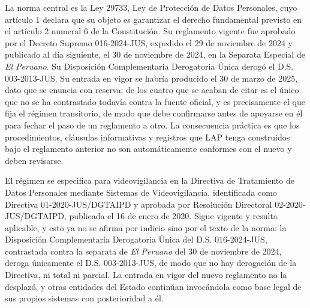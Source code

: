 La norma central es la Ley 29733, Ley de Protección de Datos Personales,
cuyo artículo 1 declara que su objeto es garantizar el derecho
fundamental previsto en el artículo 2 numeral 6 de la Constitución. Su
reglamento vigente fue aprobado por el Decreto Supremo 016-2024-JUS,
expedido el 29 de noviembre de 2024 y publicado al día siguiente, el 30
de noviembre de 2024, en la Separata Especial de \emph{El Peruano}. Su
Disposición Complementaria Derogatoria Única derogó el D.S.
003-2013-JUS. Su entrada en vigor se habría producido el 30 de marzo de
2025, dato que se enuncia con reserva: de los cuatro que se acaban de
citar es el único que no se ha contrastado todavía contra la fuente
oficial, y es precisamente el que fija el régimen transitorio, de modo
que debe confirmarse antes de apoyarse en él para fechar el paso de un
reglamento a otro. La consecuencia práctica es que los procedimientos,
cláusulas informativas y registros que LAP tenga construidos bajo el
reglamento anterior no son automáticamente conformes con el nuevo y
deben revisarse. 

El régimen se especifica para videovigilancia en la Directiva de
Tratamiento de Datos Personales mediante Sistemas de Videovigilancia,
identificada como Directiva 01-2020-JUS/DGTAIPD y aprobada por
Resolución Directoral 02-2020-JUS/DGTAIPD, publicada el 16 de enero de
2020. Sigue vigente y resulta aplicable, y esto ya no se afirma por
indicio sino por el texto de la norma: la Disposición Complementaria
Derogatoria Única del D.S. 016-2024-JUS, contrastada contra la separata
de \emph{El Peruano} del 30 de noviembre de 2024, deroga únicamente el
D.S. 003-2013-JUS, de modo que no hay derogación de la Directiva, ni
total ni parcial. La entrada en vigor del nuevo reglamento no la
desplazó, y otras entidades del Estado continúan invocándola como base
legal de sus propios sistemas con posterioridad a él.

